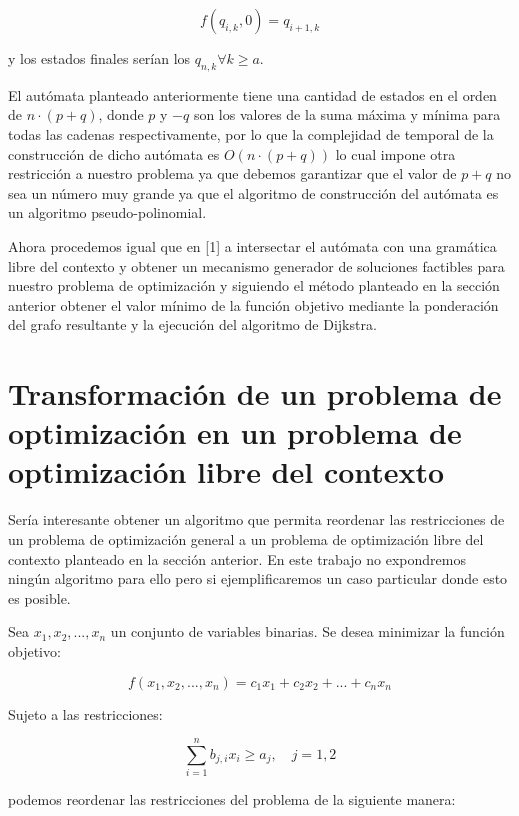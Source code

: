 \documentclass{article}
\begin{document}
\begin{equation}
    f(q_{i,k},0)=q_{i+1,k}
\end{equation}

y los estados finales serían los $q_{n,k} \forall k\geq a$. 

El autómata planteado anteriormente tiene una cantidad de estados en el orden de $n\cdot(p+q)$, donde $p$ y $-q$ son los valores de la suma máxima
y mínima para todas las cadenas respectivamente, por lo que la complejidad de temporal de la construcción de dicho autómata es $O(n\cdot(p+q))$ lo cual 
impone otra restricción a nuestro problema ya que debemos garantizar que el valor de $p+q$ no sea un número muy grande ya que el algoritmo de construcción
del autómata es un algoritmo pseudo-polinomial.

Ahora procedemos igual que en [1] a intersectar el autómata con una gramática libre del contexto y obtener un mecanismo generador de soluciones factibles
para nuestro problema de optimización y siguiendo el método planteado en la sección anterior obtener el valor mínimo de la función objetivo mediante la ponderación
del grafo resultante y la ejecución del algoritmo de Dijkstra.

\section*{Transformación de un problema de optimización en un problema de optimización libre del contexto}

Sería interesante obtener un algoritmo que permita reordenar las restricciones de un problema de optimización general a un problema de optimización
libre del contexto planteado en la sección anterior. En este trabajo no expondremos ningún algoritmo para ello pero si ejemplificaremos un caso particular
donde esto es posible. 

Sea $x_1, x_2, ..., x_n$ un conjunto de variables binarias. Se desea minimizar la función objetivo:

\begin{equation}
    f(x_1, x_2, ..., x_n) = c_1x_1 + c_2x_2 + ... + c_nx_n
\end{equation}

Sujeto a las restricciones:

\begin{equation}
    \sum_{i = 1}^{n} b_{j,i}x_i \geq a_j, \quad j = 1, 2
\end{equation}

podemos reordenar las restricciones del problema de la siguiente manera:
\end{document}
